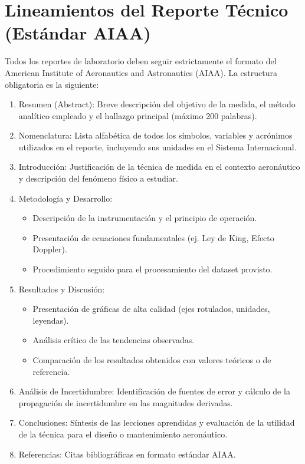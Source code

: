\documentclass[11pt, a4paper]{article}
\begin{document}
\newpage
\section{Lineamientos del Reporte Técnico (Estándar AIAA)}
Todos los reportes de laboratorio deben seguir estrictamente el formato del American Institute of Aeronautics and Astronautics (AIAA). La estructura obligatoria es la siguiente:

\begin{enumerate}
    \item Resumen (Abstract): Breve descripción del objetivo de la medida, el método analítico empleado y el hallazgo principal (máximo 200 palabras).
    \item Nomenclatura: Lista alfabética de todos los símbolos, variables y acrónimos utilizados en el reporte, incluyendo sus unidades en el Sistema Internacional.
    \item Introducción: Justificación de la técnica de medida en el contexto aeronáutico y descripción del fenómeno físico a estudiar.
    \item Metodología y Desarrollo:
    \begin{itemize}
        \item Descripción de la instrumentación y el principio de operación.
        \item Presentación de ecuaciones fundamentales (ej. Ley de King, Efecto Doppler).
        \item Procedimiento seguido para el procesamiento del dataset provisto.
    \end{itemize}
    \item Resultados y Discusión:
    \begin{itemize}
        \item Presentación de gráficas de alta calidad (ejes rotulados, unidades, leyendas).
        \item Análisis crítico de las tendencias observadas.
        \item Comparación de los resultados obtenidos con valores teóricos o de referencia.
    \end{itemize}
    \item Análisis de Incertidumbre: Identificación de fuentes de error y cálculo de la propagación de incertidumbre en las magnitudes derivadas.
    \item Conclusiones: Síntesis de las lecciones aprendidas y evaluación de la utilidad de la técnica para el diseño o mantenimiento aeronáutico.
    \item Referencias: Citas bibliográficas en formato estándar AIAA.
\end{enumerate}
\end{document}
